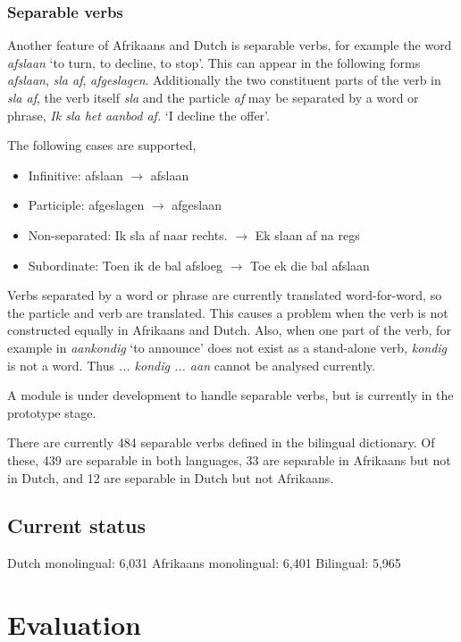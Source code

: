\documentclass[11pt]{article}
\begin{document}
\subsubsection{Separable verbs}

Another feature of Afrikaans and Dutch is separable verbs, for example
the word {\em afslaan} `to turn, to decline, to stop'. This can appear in the following
forms {\em afslaan}, {\em sla af}, {\em afgeslagen}. Additionally the two constituent
parts of the verb in {\em sla af}, the verb itself {\em sla} and the particle
{\em af} may be separated by a word or phrase, {\em Ik sla het aanbod af.}
 `I decline the offer'.

The following cases are supported,

\begin{itemize}
\item Infinitive: afslaan $\rightarrow$ afslaan 
\item Participle: afgeslagen $\rightarrow$ afgeslaan
\item Non-separated: Ik sla af naar rechts. $\rightarrow$ Ek slaan af na regs
\item Subordinate: Toen ik de bal afsloeg $\rightarrow$ Toe ek die bal afslaan
\end{itemize}

Verbs separated by a word or phrase are currently translated word-for-word,
so the particle and verb are translated. This causes a problem when the
verb is not constructed equally in Afrikaans and Dutch. Also, when one part
of the verb, for example in {\em aankondig} `to announce' does not exist as
a stand-alone verb, {\em kondig} is not a word. Thus {\em ... kondig ... aan} 
cannot be analysed currently.

A module is under development to handle separable verbs, but is currently
in the prototype stage.

There are currently 484 separable verbs defined in the bilingual
dictionary. Of these, 439 are separable in both languages, 33 are
separable in Afrikaans but not in Dutch, and 12 are separable in
Dutch but not Afrikaans.

\subsection{Current status}

Dutch monolingual: 6,031
Afrikaans monolingual: 6,401
Bilingual: 5,965

\section{Evaluation}
\end{document}
